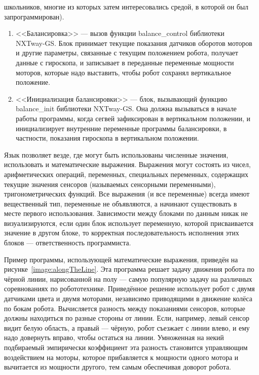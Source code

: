 \begin{enumerate}
		школьников, многие из которых затем интересовались средой, в которой он был запрограммирован).
		\begin{enumerate}
			\item <<Балансировка>> --- вызов функции balance\_control библиотеки NXTway-GS. 
				Блок принимает текущие показания датчиков оборотов моторов и другие параметры, 
				связанные с текущим положением робота, получает данные с гироскопа, и записывает 
				в переданные переменные мощности моторов, которые надо выставить, чтобы робот 
				сохранял вертикальное положение.
			\item <<Инициализация балансировки>> --- блок, вызывающий функцию balance\_init 
				библиотеки NXTway-GS. Она должна вызываться в начале работы программы, когда 
				сегвей зафиксирован в вертикальном положении, и инициализирует внутренние 
				переменные программы балансировки, в частности, показания гироскопа в вертикальном 
				положении.
		\end{enumerate}
\end{enumerate}

Язык позволяет везде, где могут быть использованы численные значения, использовать 
и математические выражения. Выражения могут состоять из чисел, арифметических операций, переменных, специальных переменных, содержащих текущие значения сенсоров (называемых сенсорными переменными), тригонометрических функций. Все выражения (и все переменные) всегда имеют вещественный тип, переменные не объявляются, а начинают существовать в месте первого использования. Зависимости между блоками по данным никак не визуализируются, если один блок использует переменную, которой присваивается значение в другом блоке, то корректная последовательность исполнения этих блоков --- ответственность программиста. 

Пример программы, использующей математические выражения, приведён на рисунке~\ref{image:alongTheLine}. 
Эта программа решает задачу движения робота по чёрной линии, нарисованной на полу --- 
самую популярную задачу на различных соревнованиях по робототехнике. Приведённое решение 
использует робот с двумя датчиками цвета и двумя моторами, независимо приводящими в 
движение колёса по бокам робота. Вычисляется разность между показаниями сенсоров, 
которые должны находиться по разные стороны от линии. Если, например, левый сенсор 
видит белую область, а правый --- чёрную, робот съезжает с линии влево, и ему надо 
довернуть вправо, чтобы остаться на линии. Умноженная на некий подбираемый эмпирически 
коэффициент эта разность становится управляющим воздействием на моторы, которое прибавляется 
к мощности одного мотора и вычитается из мощности другого, тем самым обеспечивая доворот робота.

